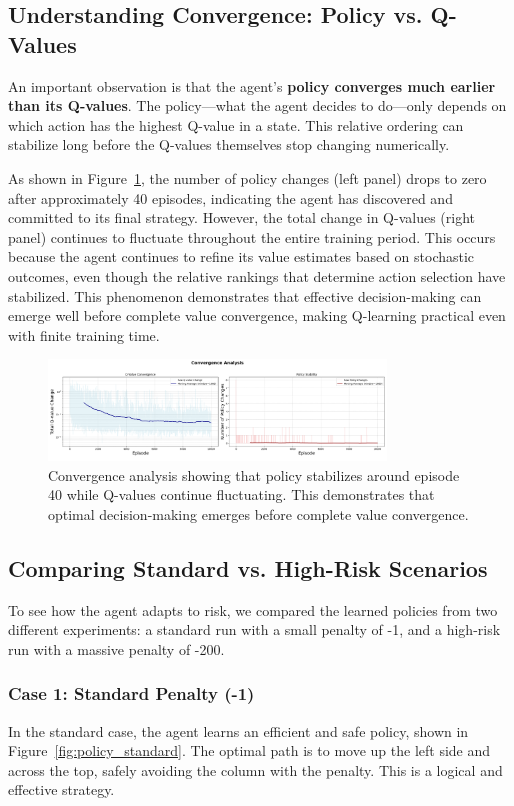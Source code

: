 \documentclass[11pt, a4paper]{article}
\begin{document}
\subsection{Understanding Convergence: Policy vs. Q-Values}
An important observation is that the agent's \textbf{policy converges much earlier than its Q-values}. The policy—what the agent decides to do—only depends on which action has the highest Q-value in a state. This relative ordering can stabilize long before the Q-values themselves stop changing numerically.

As shown in Figure~\ref{fig:convergence}, the number of policy changes (left panel) drops to zero after approximately 40 episodes, indicating the agent has discovered and committed to its final strategy. However, the total change in Q-values (right panel) continues to fluctuate throughout the entire training period. This occurs because the agent continues to refine its value estimates based on stochastic outcomes, even though the relative rankings that determine action selection have stabilized. This phenomenon demonstrates that effective decision-making can emerge well before complete value convergence, making Q-learning practical even with finite training time.

\begin{figure}[H]
    \centering
    \includegraphics[width=0.8\textwidth]{images/convergence.png}
    \caption{Convergence analysis showing that policy stabilizes around episode 40 while Q-values continue fluctuating. This demonstrates that optimal decision-making emerges before complete value convergence.}\label{fig:convergence}
\end{figure}

\subsection{Comparing Standard vs. High-Risk Scenarios}
To see how the agent adapts to risk, we compared the learned policies from two different experiments: a standard run with a small penalty of -1, and a high-risk run with a massive penalty of -200.

\subsubsection{Case 1: Standard Penalty (-1)}
In the standard case, the agent learns an efficient and safe policy, shown in Figure~\ref{fig:policy_standard}. The optimal path is to move up the left side and across the top, safely avoiding the column with the penalty. This is a logical and effective strategy.
\end{document}
